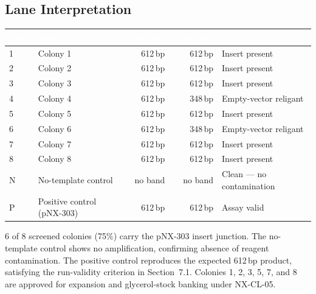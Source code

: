\subsection{Lane Interpretation}

\begin{center}
\footnotesize
\begin{tabularx}{0.9\linewidth}{@{}l l r r X@{}}
\toprule
\rowcolor{pcrforest}
\textcolor{white}{\textbf{Lane}} & \textcolor{white}{\textbf{Sample}} & \textcolor{white}{\textbf{Expected}} & \textcolor{white}{\textbf{Observed}} & \textcolor{white}{\textbf{Call}} \\
\midrule
1 & Colony 1 & 612\,bp & 612\,bp & Insert present \\
2 & Colony 2 & 612\,bp & 612\,bp & Insert present \\
3 & Colony 3 & 612\,bp & 612\,bp & Insert present \\
4 & Colony 4 & 612\,bp & 348\,bp & Empty-vector religant \\
5 & Colony 5 & 612\,bp & 612\,bp & Insert present \\
6 & Colony 6 & 612\,bp & 348\,bp & Empty-vector religant \\
7 & Colony 7 & 612\,bp & 612\,bp & Insert present \\
8 & Colony 8 & 612\,bp & 612\,bp & Insert present \\
\midrule
N & No-template control & no band & no band & Clean --- no contamination \\
P & Positive control (pNX-303) & 612\,bp & 612\,bp & Assay valid \\
\bottomrule
\end{tabularx}
\end{center}

\begin{notebox}
6 of 8 screened colonies (75\%) carry the pNX-303 insert junction. The no-template control shows
no amplification, confirming absence of reagent contamination. The positive control reproduces
the expected 612\,bp product, satisfying the run-validity criterion in Section~7.1. Colonies 1,
2, 3, 5, 7, and 8 are approved for expansion and glycerol-stock banking under NX-CL-05.
\end{notebox}
